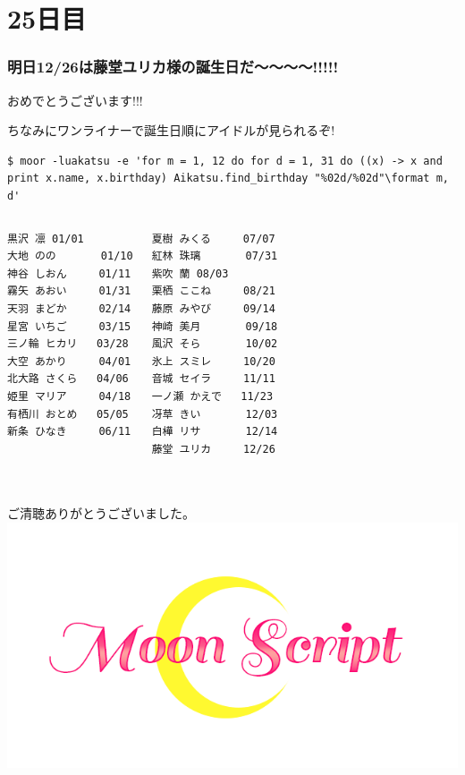 \section{25日目}
\begin{frame}[fragile]
	\frametitle{明日12/26は藤堂ユリカ様の誕生日だ〜〜〜〜!!!!!}
	おめでとうございます!!!

	\pause
	ちなみにワンライナーで誕生日順にアイドルが見られるぞ!

	\tiny
	\begin{lstlisting}[numbers=none]
$ moor -luakatsu -e 'for m = 1, 12 do for d = 1, 31 do ((x) -> x and print x.name, x.birthday) Aikatsu.find_birthday "%02d/%02d"\format m, d'
	\end{lstlisting}

	\scriptsize
	\begin{columns}
		\column[t]{.5\hsize}
		\begin{lstlisting}[numbers=none]
黒沢 凛 01/01
大地 のの       01/10
神谷 しおん     01/11
霧矢 あおい     01/31
天羽 まどか     02/14
星宮 いちご     03/15
三ノ輪 ヒカリ   03/28
大空 あかり     04/01
北大路 さくら   04/06
姫里 マリア     04/18
有栖川 おとめ   05/05
新条 ひなき     06/11
		\end{lstlisting}
		\column[t]{.5\hsize}
		\begin{lstlisting}[numbers=none]
夏樹 みくる     07/07
紅林 珠璃       07/31
紫吹 蘭 08/03
栗栖 ここね     08/21
藤原 みやび     09/14
神崎 美月       09/18
風沢 そら       10/02
氷上 スミレ     10/20
音城 セイラ     11/11
一ノ瀬 かえで   11/23
冴草 きい       12/03
白樺 リサ       12/14
藤堂 ユリカ     12/26
		\end{lstlisting}
	\end{columns}
\end{frame}

\section{}
\begin{frame}


	\alert{\LARGE\thetitle}

	\begin{center}
		ご清聴ありがとうございました。
		\includegraphics[width=.6\textwidth]{img/sailormoonscript.png}
	\end{center}
	\vfill
\end{frame}
